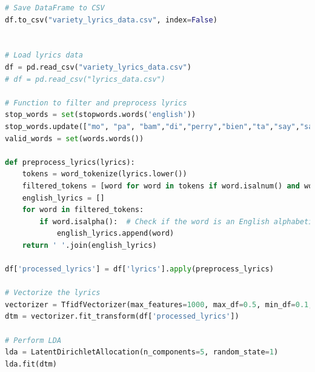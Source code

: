 \documentclass{article}
\begin{document}
\begin{lstlisting}[language=Python]
# Save DataFrame to CSV
df.to_csv("variety_lyrics_data.csv", index=False)


# Load lyrics data
df = pd.read_csv("variety_lyrics_data.csv")
# df = pd.read_csv("lyrics_data.csv")

# Function to filter and preprocess lyrics
stop_words = set(stopwords.words('english'))
stop_words.update(["mo", "pa", "bam","di","perry","bien","ta","say","said","make","come","got","let","chorus","yes","gon", "wo", "oh", "ca", "ai", "yeah", "travis", "wan", "hey", "ooh", "la", "da", "na", "eh", "ah", "whoa", "uh", "woo", "wow", "ohh", "oohh", "laa", "daa", "naa", "ehh", "ahh", "whoaa", "uhh", "wooo", "woww", "ohhh", "oohhh", "laaa", "daaa", "naaa", "ehhh", "ahhh", "whoaaa", "uhhh", "woooo", "wowww", "ohhhh", "oohhhh", "laaaa", "daaaa", "naaaa", "ehhhh", "ahhhh", "whoaaaa", "uhhhh", "wooooo", "wowwww", "ohhhhh", "oohhhhh", "laaaaa", "daaaaa", "naaaaa", "ehhhh", "ahhhh", "whoaaaaa", "uhhhhh", "woooooo", "wowwwww", "ohhhhhh", "oohhhhhh", "laaaaaa", "daaaaaa", "naaaaaa", "ehhhhh", "ahhhhh", "whoaaaaaa", "uhhhhhh", "wooooooo", "wowwwwww", "ohhhhhhh", "oohhhhhhh", "laaaaaaa", "daaaaaaa", "naaaaaaa", "ehhhhhh", "ahhhhhh", "whoaaaaaaa", "uhhhhhhh", "woooooooo", "wowwwwwww", "ohhhhhhhh", "oohhhhhhhh", "laaaaaaaa", "daaaaaaaa", "naaaaaaaa", "ehhhhhhh", "ahhhhhhh", "whoaaaaaaaa", "uhhhhhhhh", "wooooooooo", "wowwwwwwww", "ohhhhhhhhh", "oohhhhhhhhh", "laaaaaaaaa", "daaaaaaaaa", "naaaaaaaaa", "ehhhhhhhh", "ahhhhhhhh", "whoaaaaaaaaa", "uhhhhhhhhh", "woooooooooo", "wowwwwwwwww", "ohhhhhhhhhh", "oohhhhhhhhhh", "laaaaaaaaaa", "daaaaaaaaaa", "naaaaaaaaaa", "ehhhhhhhhh"])
valid_words = set(words.words())

def preprocess_lyrics(lyrics):
    tokens = word_tokenize(lyrics.lower())
    filtered_tokens = [word for word in tokens if word.isalnum() and word not in stop_words and word in valid_words]
    english_lyrics = []
    for word in filtered_tokens:
        if word.isalpha():  # Check if the word is an English alphabetic word
            english_lyrics.append(word)
    return ' '.join(english_lyrics)

df['processed_lyrics'] = df['lyrics'].apply(preprocess_lyrics)

# Vectorize the lyrics
vectorizer = TfidfVectorizer(max_features=1000, max_df=0.5, min_df=0.1, stop_words='english')
dtm = vectorizer.fit_transform(df['processed_lyrics'])

# Perform LDA
lda = LatentDirichletAllocation(n_components=5, random_state=1)
lda.fit(dtm)


\end{lstlisting}
\end{document}
